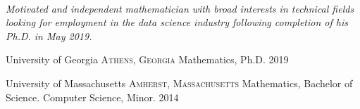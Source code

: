 \documentclass[10pt,a4paper]{article}
\begin{document}
{   
\\

\spacedhrule{1em}{-.4em}


\vspace{-1em}
\noindent
\begin{center}
  \parbox{5.3in}{\emph{Motivated and independent mathematician with broad interests in technical fields looking for employment in the data science industry following completion of his Ph.D. in May 2019.}}
\end{center}
  
\spacedhrule{0.5em}{-.04em}


\headedsection
  {University of Georgia}
  {\textsc{Athens, Georgia}} {%
  \headedsubsection
    {Mathematics, Ph.D.}
    {2019}
    {}
}

\headedsection
  {University of Massachusetts}
  {\textsc{Amherst, Massachusetts}} {%
  \headedsubsection
    {Mathematics, Bachelor of Science. Computer Science, Minor.}
    {2014}
    {}
}
\spacedhrule{0.5em}{-0.4em}


}
\end{document}
